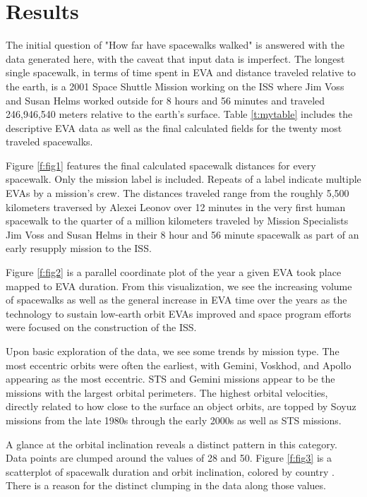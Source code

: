 \documentclass[sigconf]{acmart}
\begin{document}
\section{Results}
The initial question of "How far have spacewalks walked" is answered with the data generated here, with the caveat that input data is imperfect. The longest single spacewalk, in terms of time spent in EVA and distance traveled relative to the earth, is a 2001 Space Shuttle Mission working on the ISS where Jim Voss and Susan Helms worked outside for 8 hours and 56 minutes and traveled 246,946,540 meters relative to the earth's surface. Table \ref{t:mytable} includes the descriptive EVA data as well as the final calculated fields for the twenty most traveled spacewalks. 

Figure \ref{f:fig1} features the final calculated spacewalk distances for every spacewalk. Only the mission label is included. Repeats of a label indicate multiple EVAs by a mission's crew. The distances traveled range from the roughly 5,500 kilometers traversed by Alexei Leonov over 12 minutes in the very first human spacewalk to the quarter of a million kilometers traveled by Mission Specialists Jim Voss and Susan Helms in their 8 hour and 56 minute spacewalk as part of an early resupply mission to the ISS. 

Figure \ref{f:fig2} is a parallel coordinate plot of the year a given EVA took place mapped to EVA duration.  From this visualization, we see the increasing volume of spacewalks as well as the general increase in EVA time over the years as the technology to sustain low-earth orbit EVAs improved and space program efforts were focused on the construction of the ISS. 

Upon basic exploration of the data, we see some trends by mission type. The most eccentric orbits were often the earliest, with Gemini, Voskhod, and Apollo appearing as the most eccentric. STS and Gemini missions appear to be the missions with the largest orbital perimeters. The highest orbital velocities, directly related to how close to the surface an object orbits, are topped by Soyuz missions from the late 1980s through the early 2000s as well as STS missions. 

A glance at the orbital inclination reveals a distinct pattern in this category. Data points are clumped around the values of 28 and 50. Figure \ref{f:fig3} is a scatterplot of spacewalk duration and orbit inclination, colored by country \cite{Waskom2017}. There is a reason for the distinct clumping in the data along those values.
\end{document}

